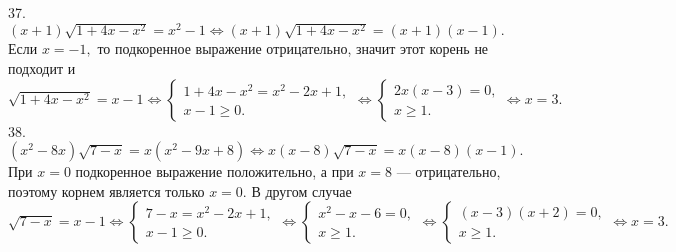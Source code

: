 37. $(x+1)\sqrt{1+4x-x^2}=x^2-1\Leftrightarrow (x+1)\sqrt{1+4x-x^2}=(x+1)(x-1).$ Если $x=-1,$ то подкоренное выражение отрицательно, значит этот корень не подходит и $\sqrt{1+4x-x^2}=x-1\Leftrightarrow\begin{cases}1+4x-x^2=x^2-2x+1,\\ x-1\geqslant0.\end{cases}
\Leftrightarrow\begin{cases}2x(x-3)=0,\\ x\geqslant1.\end{cases}\Leftrightarrow
x=3.$\\
38. $(x^2-8x)\sqrt{7-x}=x(x^2-9x+8)\Leftrightarrow x(x-8)\sqrt{7-x}=x(x-8)(x-1).$ При $x=0$ подкоренное выражение положительно, а при $x=8$ --- отрицательно, поэтому корнем является только $x=0.$ В другом случае $\sqrt{7-x}=x-1\Leftrightarrow \begin{cases} 7-x=x^2-2x+1,\\ x-1\geqslant0.\end{cases}
\Leftrightarrow \begin{cases} x^2-x-6=0,\\ x\geqslant1.\end{cases}
\Leftrightarrow \begin{cases} (x-3)(x+2)=0,\\ x\geqslant1.\end{cases}\Leftrightarrow x=3.$

